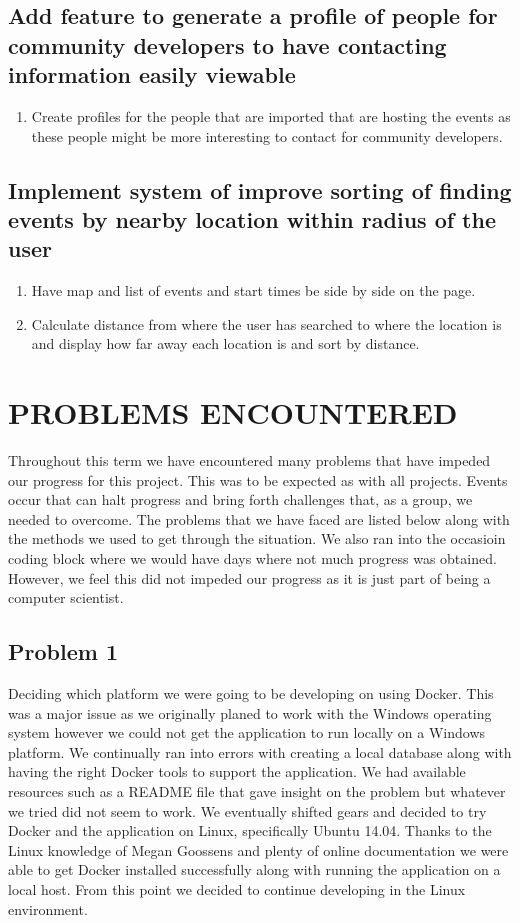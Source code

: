 \documentclass[draftclsnofoot,10pt,onecolumn]{IEEEtran} %
\begin{document}
\subsection{Add feature to generate a profile of people for community developers to have contacting information easily viewable}
\begin{enumerate}
	\item Create profiles for the people that are imported that are hosting the events as these people might be more interesting to contact for community developers.
\end{enumerate}

\subsection{Implement system of improve sorting of finding events by nearby location within radius of the user}
\begin{enumerate}
  \item Have map and list of events and start times be side by side on the page.
  \item Calculate distance from where the user has searched to where the location is and display how far away each location is and sort by distance.
\end{enumerate}

\section{PROBLEMS ENCOUNTERED}

Throughout this term we have encountered many problems that have impeded our
progress for this project. This was to be expected as with all projects. 
Events
occur that can halt progress and bring forth challenges that, as a group, we
needed to overcome. The problems that we have faced are listed below along with
the methods we used to get through the situation. We also ran into the occasioin coding block where we would have days where not much progress was obtained. However, we feel this did not impeded our progress as
it is just part of being a computer scientist.

\subsection{Problem 1}
Deciding which platform we were going to be developing on using Docker. This was
a major issue as we originally planed to work with the Windows operating system
however we could not get the application to run locally on a Windows platform.
We continually ran into errors with creating a local database along with having
the right Docker tools to support the application. We had available resources
such as a README file that gave insight on the problem but whatever we tried did
not seem to work. We eventually shifted gears and decided to try Docker and the
application on Linux, specifically Ubuntu 14.04. Thanks to the Linux knowledge
of Megan Goossens and plenty of online documentation we were able to get Docker
installed successfully along with running the application on a local host. From
this point we decided to continue developing in the Linux environment.
\end{document}
